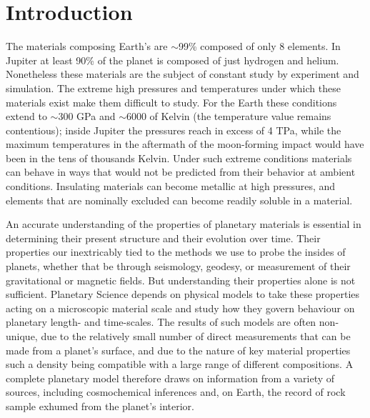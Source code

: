 \chapter{Introduction}\label{chap1}

The materials composing Earth's are $\sim$99\% composed of only 8 elements. In
Jupiter at least 90\% of the planet is composed of just hydrogen and helium.
Nonetheless these materials are the subject of constant study by experiment and
simulation. The extreme high pressures and temperatures under which these
materials exist make them difficult to study. For the Earth these conditions
extend to $\sim$300 GPa and $\sim$6000 of Kelvin \citep{alfe2009} (the
temperature value remains contentious); inside Jupiter the pressures reach in
excess of 4 TPa, while the maximum temperatures in the aftermath of the
moon-forming impact would  have been in the tens of thousands Kelvin. Under
such extreme conditions materials can behave in ways that would not be
predicted from their behavior at ambient conditions. Insulating materials can
become metallic at high pressures, and elements that are nominally excluded can
become readily soluble in a material.

An accurate understanding of the properties of planetary materials is essential
in determining their present structure and their evolution over time. Their
properties our inextricably tied to the methods we use to probe the insides of
planets, whether that be through seismology, geodesy, or measurement of their
gravitational or magnetic fields. But understanding their properties alone is
not sufficient. Planetary Science depends on physical models to take these
properties acting on a microscopic material scale and study how they govern
behaviour on planetary length- and time-scales. The results of such models are
often non-unique, due to the relatively small number of direct measurements
that can be made from a planet's surface, and due to the nature of key material
properties such a density  being compatible with a large range of different
compositions. A complete planetary model therefore draws on information from a
variety of sources, including cosmochemical inferences and, on Earth, the
record of rock sample exhumed from the planet's interior.

